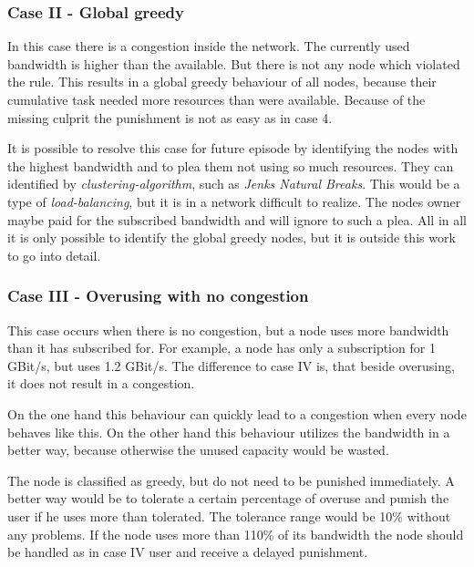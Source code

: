 \documentclass[thesis.tex]{subfiles}
\begin{document}
\subsubsection{Case II - Global greedy}
In this case there is a congestion inside the network. The currently used bandwidth is higher than the available. But there is not any node which violated the rule. This results in a global greedy behaviour of all nodes, because their cumulative task needed more resources than were available.  Because of the missing culprit the punishment is not as easy as in case 4.

It is possible to resolve this case for future episode by identifying the nodes with the highest bandwidth and to plea them not using so much resources. They can identified by \textit{clustering-algorithm}, such as \textit{Jenks Natural Breaks}. This would be a type of \textit{load-balancing}, but it is in a network difficult to realize. The nodes owner maybe paid for the subscribed bandwidth and will ignore to such a plea. All in all it is only possible to identify the global greedy nodes, but it is outside this work to go into detail.


\subsubsection{Case III - Overusing with no congestion}
This case occurs when there is no congestion, but a  node uses more bandwidth than it has subscribed for. For example, a node has only a subscription for 1 GBit/s, but uses 1.2 GBit/s. The difference to case IV is, that beside overusing, it does not result in a congestion.

On the one hand this behaviour can quickly lead to a congestion when every node behaves like this. On the other hand this behaviour utilizes the bandwidth in a better way, because otherwise the unused capacity would be wasted.

The node is classified as greedy, but do not need to be punished immediately. A better way would be to tolerate a certain percentage of overuse and punish the user if he uses more than tolerated. The tolerance range would be 10\% without any problems. If the node uses more than 110\% of its bandwidth the node should be handled as in case IV user and receive a delayed punishment.

\end{document}
